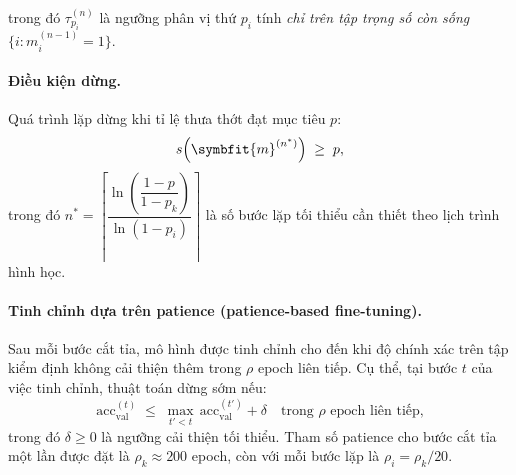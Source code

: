 trong đó $\tau_{p_i}^{(n)}$ là ngưỡng phân vị thứ $p_i$ tính \emph{chỉ trên tập trọng số còn sống} $\{i : m_i^{(n-1)} = 1\}$.

\paragraph{\textbf{Điều kiện dừng.}}
Quá trình lặp dừng khi tỉ lệ thưa thớt đạt mục tiêu $p$:
\begin{equation}
    s\!\left(\symbfit{m}^{(n^*)}\right) \;\geq\; p,
    \label{eq:stopping}
\end{equation}
trong đó $n^* = \left\lceil \dfrac{\ln\!\left(\dfrac{1-p}{1-p_k}\right)}{\ln(1-p_i)} \right\rceil$
là số bước lặp tối thiểu cần thiết theo lịch trình hình học.

\paragraph{\textbf{Tinh chỉnh dựa trên patience (patience-based fine-tuning).}}
Sau mỗi bước cắt tỉa, mô hình được tinh chỉnh cho đến khi độ chính xác trên tập kiểm định không cải thiện thêm trong $\rho$ epoch liên tiếp.
Cụ thể, tại bước $t$ của việc tinh chỉnh, thuật toán dừng sớm nếu:
\begin{equation}
    \text{acc}_{\text{val}}^{(t)} \;\leq\; \max_{t' < t}\,\text{acc}_{\text{val}}^{(t')} + \delta
    \quad \text{trong } \rho \text{ epoch liên tiếp,}
    \label{eq:patience}
\end{equation}
trong đó $\delta \geq 0$ là ngưỡng cải thiện tối thiểu.
Tham số patience cho bước cắt tỉa một lần được đặt là $\rho_k \approx 200$ epoch,
còn với mỗi bước lặp là $\rho_i = \rho_k / 20$.


